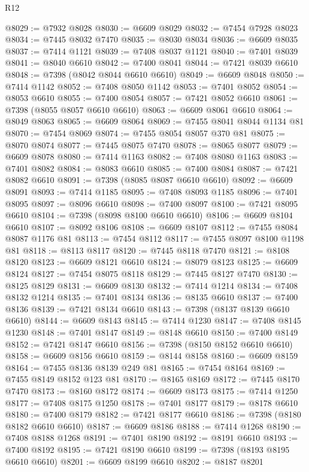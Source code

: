 \begin{lexlean}{R12}
\begin{coremodule}
{{{{{{{{{{{{{{{{{{{{{{{{{{{{{{{{{{{{{{{{{{{{{{{{{{{{{{{{{{{{{{{{{{{{{{{{{{{{{{{{{{@8029 := @7932 @8028
@8030 := @6609 @8029
@8032 := @7454 @7928 @8023
@8034 := @7445 @8032 @7470
@8035 := @8030 @8034
@8036 := @6609 @8035
@8037 := @7414 @1121
@8039 := @7408 @8037 @1121
@8040 := @7401 @8039
@8041 := @8040 @6610
@8042 := @7400 @8041
@8044 := @7421 @8039 @6610
@8048 := @7398 (@8042 @8044 @6610 @6610)
@8049 := @6609 @8048
@8050 := @7414 @1142
@8052 := @7408 @8050 @1142
@8053 := @7401 @8052
@8054 := @8053 @6610
@8055 := @7400 @8054
@8057 := @7421 @8052 @6610
@8061 := @7398 (@8055 @8057 @6610 @6610)
@8063 := @6609 @8061 @6610
@8064 := @8049 @8063
@8065 := @6609 @8064
@8069 := @7455 @8041 @8044 @1134 @81
@8070 := @7454 @8069
@8074 := @7455 @8054 @8057 @370 @81
@8075 := @8070 @8074
@8077 := @7445 @8075 @7470
@8078 := @8065 @8077
@8079 := @6609 @8078
@8080 := @7414 @1163
@8082 := @7408 @8080 @1163
@8083 := @7401 @8082
@8084 := @8083 @6610
@8085 := @7400 @8084
@8087 := @7421 @8082 @6610
@8091 := @7398 (@8085 @8087 @6610 @6610)
@8092 := @6609 @8091
@8093 := @7414 @1185
@8095 := @7408 @8093 @1185
@8096 := @7401 @8095
@8097 := @8096 @6610
@8098 := @7400 @8097
@8100 := @7421 @8095 @6610
@8104 := @7398 (@8098 @8100 @6610 @6610)
@8106 := @6609 @8104 @6610
@8107 := @8092 @8106
@8108 := @6609 @8107
@8112 := @7455 @8084 @8087 @1176 @81
@8113 := @7454 @8112
@8117 := @7455 @8097 @8100 @1198 @81
@8118 := @8113 @8117
@8120 := @7445 @8118 @7470
@8121 := @8108 @8120
@8123 := @6609 @8121 @6610
@8124 := @8079 @8123
@8125 := @6609 @8124
@8127 := @7454 @8075 @8118
@8129 := @7445 @8127 @7470
@8130 := @8125 @8129
@8131 := @6609 @8130
@8132 := @7414 @1214
@8134 := @7408 @8132 @1214
@8135 := @7401 @8134
@8136 := @8135 @6610
@8137 := @7400 @8136
@8139 := @7421 @8134 @6610
@8143 := @7398 (@8137 @8139 @6610 @6610)
@8144 := @6609 @8143
@8145 := @7414 @1230
@8147 := @7408 @8145 @1230
@8148 := @7401 @8147
@8149 := @8148 @6610
@8150 := @7400 @8149
@8152 := @7421 @8147 @6610
@8156 := @7398 (@8150 @8152 @6610 @6610)
@8158 := @6609 @8156 @6610
@8159 := @8144 @8158
@8160 := @6609 @8159
@8164 := @7455 @8136 @8139 @249 @81
@8165 := @7454 @8164
@8169 := @7455 @8149 @8152 @123 @81
@8170 := @8165 @8169
@8172 := @7445 @8170 @7470
@8173 := @8160 @8172
@8174 := @6609 @8173
@8175 := @7414 @1250
@8177 := @7408 @8175 @1250
@8178 := @7401 @8177
@8179 := @8178 @6610
@8180 := @7400 @8179
@8182 := @7421 @8177 @6610
@8186 := @7398 (@8180 @8182 @6610 @6610)
@8187 := @6609 @8186
@8188 := @7414 @1268
@8190 := @7408 @8188 @1268
@8191 := @7401 @8190
@8192 := @8191 @6610
@8193 := @7400 @8192
@8195 := @7421 @8190 @6610
@8199 := @7398 (@8193 @8195 @6610 @6610)
@8201 := @6609 @8199 @6610
@8202 := @8187 @8201
}}}}}}}}}}}}}}}}}}}}}}}}}}}}}}}}}}}}}}}}}}}}}}}}}}}}}}}}}}}}}}}}}}}}}}}}}}}}}}}}}}
\end{coremodule}
\end{lexlean}
